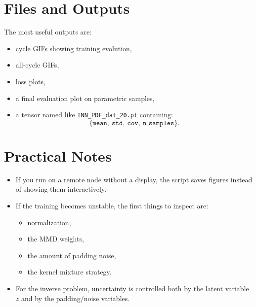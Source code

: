 \documentclass[11pt]{article}
\begin{document}
\section*{Files and Outputs}
The most useful outputs are:
\begin{itemize}[leftmargin=1.5em]
    \item cycle GIFs showing training evolution,
    \item all-cycle GIFs,
    \item loss plots,
    \item a final evaluation plot on parametric samples,
    \item a tensor named like \texttt{INN\_PDF\_dat\_20.pt} containing:
    \[
    \{\texttt{mean},\ \texttt{std},\ \texttt{cov},\ \texttt{n\_samples}\}.
    \]
\end{itemize}

\section*{Practical Notes}
\begin{itemize}[leftmargin=1.5em]
    \item If you run on a remote node without a display, the script saves figures instead of showing them interactively.
    \item If the training becomes unstable, the first things to inspect are:
    \begin{itemize}[leftmargin=1.5em]
        \item normalization,
        \item the MMD weights,
        \item the amount of padding noise,
        \item the kernel mixture strategy.
    \end{itemize}
    \item For the inverse problem, uncertainty is controlled both by the latent variable $z$ and by the padding/noise variables.
\end{itemize}
\end{document}
